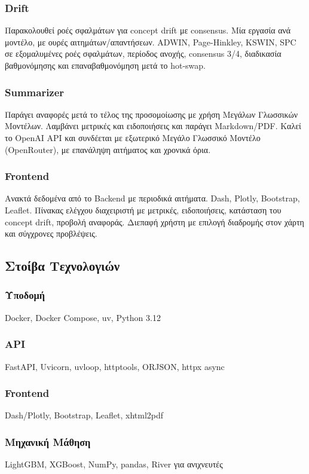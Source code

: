 \subsubsection*{Drift}
Παρακολουθεί ροές σφαλμάτων για concept drift με consensus.
Μία εργασία ανά μοντέλο, με ουρές αιτημάτων/απαντήσεων. ADWIN, Page-Hinkley, KSWIN, SPC σε εξομαλυμένες ροές σφαλμάτων, περίοδος ανοχής, consensus 3/4, διαδικασία βαθμονόμησης και επαναβαθμονόμηση μετά το hot-swap.

\subsubsection*{Summarizer}
Παράγει αναφορές μετά το τέλος της προσομοίωσης με χρήση Μεγάλων Γλωσσικών Μοντέλων.
Λαμβάνει μετρικές και ειδοποιήσεις και παράγει Markdown/PDF.
Καλεί το OpenAI API και συνδέεται με εξωτερικό Μεγάλο Γλωσσικό Μοντέλο (OpenRouter), με επανάληψη αιτήματος και χρονικά όρια.

\subsubsection*{Frontend}
Ανακτά δεδομένα από το Backend με περιοδικά αιτήματα.
Dash, Plotly, Bootstrap, Leaflet.
Πίνακας ελέγχου διαχειριστή με μετρικές, ειδοποιήσεις, κατάσταση του concept drift, προβολή αναφοράς.
Διεπαφή χρήστη με επιλογή διαδρομής στον χάρτη και σύγχρονες προβλέψεις.

\subsection*{Στοίβα Τεχνολογιών}

\subsubsection*{Υποδομή}
Docker, Docker Compose, uv, Python 3.12

\subsubsection*{API}
FastAPI, Uvicorn, uvloop, httptools, ORJSON, httpx async

\subsubsection*{Frontend}
Dash/Plotly, Bootstrap, Leaflet, xhtml2pdf

\subsubsection*{Μηχανική Μάθηση}
LightGBM, XGBoost, NumPy, pandas, River για ανιχνευτές

